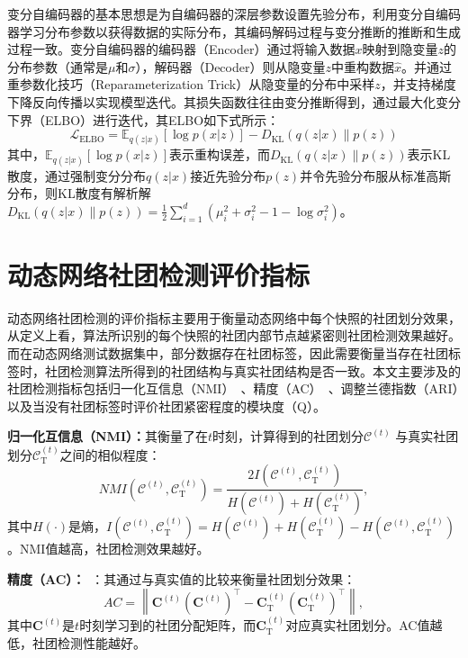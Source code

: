 变分自编码器的基本思想是为自编码器的深层参数设置先验分布，利用变分自编码器学习分布参数以获得数据的实际分布，其编码解码过程与变分推断的推断和生成过程一致。变分自编码器的编码器（Encoder）通过将输入数据$x$映射到隐变量$z$的分布参数（通常是$\mu$和$\sigma$），解码器（Decoder）则从隐变量$z$中重构数据$\hat{x}$。并通过重参数化技巧（Reparameterization Trick）从隐变量的分布中采样$z$，并支持梯度下降反向传播以实现模型迭代。其损失函数往往由变分推断得到，通过最大化变分下界（ELBO）进行迭代，其ELBO如下式所示：
\[
\mathcal{L}_{\text{ELBO}} = \mathbb{E}_{q(z|x)}[\log p(x|z)] - D_{\text{KL}}(q(z|x) \| p(z))
\]
其中，$\mathbb{E}_{q(z|x)}[\log p(x|z)]$表示重构误差，而$D_{\text{KL}}(q(z|x) \| p(z))$表示KL散度，通过强制变分分布$q(z|x)$接近先验分布$p(z)$并令先验分布服从标准高斯分布，则KL散度有解析解$D_{\text{KL}}(q(z|x) \| p(z))=\frac{1}{2}\sum_{i=1}^{d}(\mu_i^2+\sigma_i^2-1-\log \sigma_i^2)$。

\section{动态网络社团检测评价指标}
\label{chap2:metrics}
动态网络社团检测的评价指标主要用于衡量动态网络中每个快照的社团划分效果，从定义上看，算法所识别的每个快照的社团内部节点越紧密则社团检测效果越好。而在动态网络测试数据集中，部分数据存在社团标签，因此需要衡量当存在社团标签时，社团检测算法所得到的社团结构与真实社团结构是否一致。本文主要涉及的社团检测指标包括归一化互信息（NMI）~\cite{gong2007machine}、精度（AC）~\cite{folino2013evolutionary}、调整兰德指数（ARI）以及当没有社团标签时评价社团紧密程度的模块度（Q）。

\textbf{归一化互信息（NMI）：}其衡量了在$t$时刻，计算得到的社团划分$\mathcal{C}^{(t)}$ 与真实社团划分$\mathcal{C}_{\mathrm{T}}^{(t)}$之间的相似程度：
     \begin{equation}
          NMI(\mathcal{C}^{(t)},\mathcal{C}_{\mathrm{T}}^{(t)})= \frac{2I(\mathcal{C}^{(t)},\mathcal{C}_{\mathrm{T}}^{(t)})}{H(\mathcal{C}^{(t)})+H(\mathcal{C}_{\mathrm{T}}^{(t)})},
      \end{equation}
其中$H(\cdot)$是熵，$I(\mathcal{C}^{(t)},\mathcal{C}_{\mathrm{T}}^{(t)}) = H(\mathcal{C}^{(t)})+H(\mathcal{C}_{\mathrm{T}}^{(t)}) - H(\mathcal{C}^{(t)},\mathcal{C}_{\mathrm{T}}^{(t)})$。NMI值越高，社团检测效果越好。

\textbf{精度（AC）：}~\cite{folino2013evolutionary}：其通过与真实值的比较来衡量社团划分效果：
     \begin{equation}
       AC = \left \| \mathbf{C}^{(t)}(\mathbf{C}^{(t)})^{\top}-\mathbf{C}_{\mathrm{T}}^{(t)}(\mathbf{C}_{\mathrm{T}}^{(t)})^{\top} \right \|,
      \end{equation}
其中$\mathbf{C}^{(t)}$是$t$时刻学习到的社团分配矩阵，而$\mathbf{C}_{\mathrm{T}}^{(t)}$对应真实社团划分。AC值越低，社团检测性能越好。

